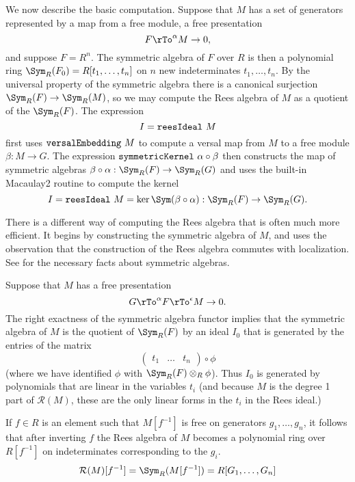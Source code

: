 \documentclass[twoside,12pt, leqno]{amsart}
\def\RR{{\mathcal R}}
\begin{document}
\begin{normalsize}
We now describe the basic computation. Suppose that $M$ has 
a set of generators represented by a map from a free module,
a free presentation
$$
 F\rTo^\alpha M\to 0,
$$
and suppose  $F = R^n$. The symmetric algebra of $F$ over $R$ is then a polynomial ring
$\Sym_R(F_0) = R[t_1,\dots, t_n]$ on $n$ new indeterminates $t_1,\dots, t_n$. By the universal
property of the symmetric algebra there is a canonical surjection
$\Sym_R(F)\rightarrow \Sym_R(M)$, so we may compute the Rees algebra of $M$ as
a quotient of the  $\Sym_R(F)$. The expression
$$
I = {\tt reesIdeal}\ M
$$
first uses ${\tt versalEmbedding\ }M$ to compute a versal map from $M$ to a free module $\beta: M\to G$. The expression ${\tt symmetricKernel\ } \alpha\circ\beta$  then constructs the map of symmetric algebras $\beta\circ \alpha:\Sym_R(F)\to \Sym_R(G)$ and uses
 the built-in Macaulay2 routine to compute the kernel 
$$
I = {\tt reesIdeal\ }M = \ker \Sym(\beta\circ\alpha): \Sym_R(F) \to \Sym_R(G).
$$

There is a different way of computing the Rees algebra that is often much more efficient. It begins by constructing the symmetric algebra of $M$, and uses the observation that the construction of the Rees algebra commutes with localization. See \cite[Appendix 2]{E} for the necessary facts about symmetric algebras.

Suppose that $M$ has a free presentation
$$
G\rTo^\alpha F\rTo^\epsilon M\to 0.
$$
The right exactness of the symmetric algebra functor implies that the symmetric algebra of $M$ is the quotient of $\Sym_R(F)$ by an ideal $I_0$ that is
generated by the
entries of the matrix
$$
\begin{pmatrix}
 t_1&\dots&t_n
 \end{pmatrix}
 \circ \phi
$$
(where we have identified $\phi$ with $\Sym_R(F)\otimes_R\phi$).
Thus $I_0$ is generated by polynomials that are linear in the variables $t_i$ (and because
$M$ is the degree 1 part of $\RR(M)$, these are the only linear forms in the $t_i$ in the
Rees ideal.)

If $f\in R$ is an element such that $M[f^{-1}]$ is free on generators $g_1,\dots, g_n$, it follows that after inverting $f$ the Rees algebra of $M$ becomes a polynomial ring over $R[f^{-1}]$ on
indeterminates corresponding to the $g_i$.
$$
\RR(M)[f^{-1}] = \Sym_R(M[f^{-1}]) = R[G_1,\dots, G_n]
$$


\end{normalsize}
\end{document}
